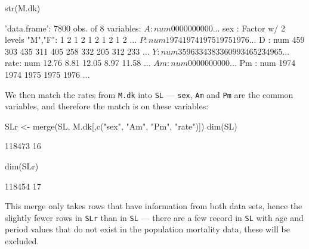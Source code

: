 \begin{enumerate}[resume]
\begin{Schunk}
\begin{Sinput}
 str(M.dk)
\end{Sinput}
\begin{Soutput}
'data.frame':	7800 obs. of  8 variables:
 $ A   : num  0 0 0 0 0 0 0 0 0 0 ...
 $ sex : Factor w/ 2 levels "M","F": 1 2 1 2 1 2 1 2 1 2 ...
 $ P   : num  1974 1974 1975 1975 1976 ...
 $ D   : num  459 303 435 311 405 258 332 205 312 233 ...
 $ Y   : num  35963 34383 36099 34652 34965 ...
 $ rate: num  12.76 8.81 12.05 8.97 11.58 ...
 $ Am  : num  0 0 0 0 0 0 0 0 0 0 ...
 $ Pm  : num  1974 1974 1975 1975 1976 ...
\end{Soutput}
\end{Schunk}
We then match the rates from \texttt{M.dk} into \texttt{SL} ---
\texttt{sex}, \texttt{Am} and \texttt{Pm} are the common variables,
and therefore the match is on these variables:
\begin{Schunk}
\begin{Sinput}
 SLr <- merge(SL, M.dk[,c("sex", "Am", "Pm", "rate")])
 dim(SL)
\end{Sinput}
\begin{Soutput}
[1] 118473     16
\end{Soutput}
\begin{Sinput}
 dim(SLr)
\end{Sinput}
\begin{Soutput}
[1] 118454     17
\end{Soutput}
\end{Schunk}
This merge only takes rows that have information from both data sets,
hence the slightly fewer rows in \texttt{SLr} than in \texttt{SL} ---
there are a few record in \texttt{SL} with age and period values that
do not exist in the population mortality data, these will be excluded.


\end{enumerate}
